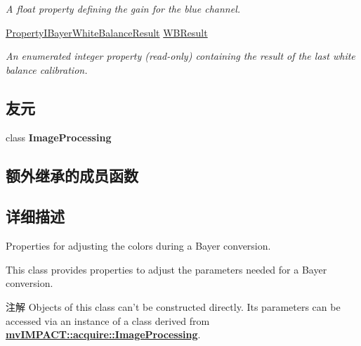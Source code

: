 \begin{DoxyCompactItemize}
\begin{DoxyCompactList}\small\item\em A float property defining the gain for the blue channel. \end{DoxyCompactList}\item 
\hyperlink{group___common_interface_ga8d7bb9e61170b53191fa8169cf685e7d}{Property\+I\+Bayer\+White\+Balance\+Result} \hyperlink{classmv_i_m_p_a_c_t_1_1acquire_1_1_white_balance_settings_adcbeebe2ff82d093cebfb3477f378e52}{W\+B\+Result}
\begin{DoxyCompactList}\small\item\em An enumerated integer property {\bfseries }(read-\/only) containing the result of the last white balance calibration. \end{DoxyCompactList}\end{DoxyCompactItemize}
\subsection*{友元}
\begin{DoxyCompactItemize}
\item 
\hypertarget{classmv_i_m_p_a_c_t_1_1acquire_1_1_white_balance_settings_aed8a20fb12bb653b1bcd24b250b8e64f}{class {\bfseries Image\+Processing}}\label{classmv_i_m_p_a_c_t_1_1acquire_1_1_white_balance_settings_aed8a20fb12bb653b1bcd24b250b8e64f}

\end{DoxyCompactItemize}
\subsection*{额外继承的成员函数}


\subsection{详细描述}
Properties for adjusting the colors during a Bayer conversion. 

This class provides properties to adjust the parameters needed for a Bayer conversion.

\begin{DoxyNote}{注解}
Objects of this class can't be constructed directly. Its parameters can be accessed via an instance of a class derived from {\bfseries \hyperlink{classmv_i_m_p_a_c_t_1_1acquire_1_1_image_processing}{mv\+I\+M\+P\+A\+C\+T\+::acquire\+::\+Image\+Processing}}. 
\end{DoxyNote}


